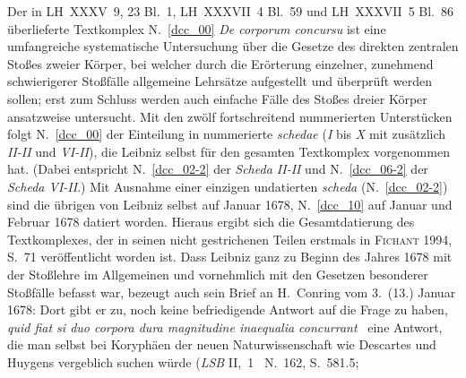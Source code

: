 %
%
%
%
%
\frenchspacing%
%
\footnotesize%
\pstart%
\noindent%
Der in LH~XXXV~9, 23 Bl.~1, LH~XXXVII~4 Bl.~59 und LH~XXXVII~5 Bl.~86 überlieferte Textkomplex N.~\ref{dcc_00} %
\textit{De corporum concursu} ist eine umfangreiche systematische Untersuchung über die Gesetze des direkten zentralen Stoßes zweier Körper, bei welcher durch die Erörterung einzelner, zunehmend schwierigerer Stoßfälle allgemeine Lehrsätze aufgestellt und überprüft werden sollen;
erst zum Schluss werden auch einfache Fälle des Stoßes dreier Körper ansatzweise untersucht.
Mit den zwölf fortschreitend nummerierten Unterstücken folgt N.~\ref{dcc_00} %
der Einteilung in nummerierte \textit{schedae} (\textit{I} bis \textit{X} mit zusätzlich \textit{II-II} und \textit{VI-II}), die Leibniz selbst für den gesamten Textkomplex vorgenommen hat.
(Dabei entspricht N.~\ref{dcc_02-2} %
der \textit{Scheda II-II} und N.~\ref{dcc_06-2} %
der \textit{Scheda VI-II}.)
Mit Ausnahme einer einzigen undatierten \textit{scheda} (N.~\ref{dcc_02-2}) %
sind die übrigen von Leibniz selbst auf Januar 1678, N.~\ref{dcc_10} %
auf Januar und Februar 1678 datiert worden.
Hieraus ergibt sich die Gesamtdatierung des Textkomplexes, %
der in seinen nicht gestrichenen Teilen erstmals in \textsc{Fichant} 1994, S.~71 veröffentlicht worden ist. 
\pend%
%
\pstart%
Dass Leibniz ganz zu Beginn des Jahres 1678 mit der Stoßlehre im Allgemeinen und vornehmlich mit den Gesetzen besonderer Stoßfälle befasst war, bezeugt auch sein Brief an H.~Conring vom 3.~(13.) Januar 1678:%
\protect{}
Dort gibt er zu, noch keine befriedigende Antwort auf die Frage zu haben, \textit{quid fiat si duo corpora dura magnitudine inaequalia concurrant} \textendash\ eine Antwort, die man selbst bei Koryphäen der neuen Naturwissenschaft wie Descartes und Huygens vergeblich suchen würde
(\textit{LSB} II,~1 \rbrack\ N.~162, S.~581.5;\cite{02053}
